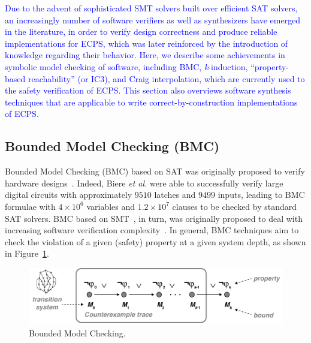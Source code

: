 \documentclass{cta-author}
\begin{document}
\textcolor{blue}{Due to the advent of sophisticated SMT solvers built over efficient SAT solvers, an increasingly number of software verifiers as well as synthesizers have emerged in the literature, in order to verify design correctness and produce reliable implementations for ECPS, which was later reinforced by the introduction of knowledge regarding their behavior. Here, we describe some achievements in symbolic model checking of software, including BMC, \textit{k}-induction, ``property-based reachability'' (or IC3), and Craig interpolation, which are currently used to the safety verification of ECPS. This section also overviews software synthesis techniques that are applicable to write correct-by-construction implementations of ECPS.}

\subsection{Bounded Model Checking (BMC)}
\label{BMC}

Bounded Model Checking (BMC) based on SAT was originally proposed to verify hardware designs~\cite{Biere99,handbook09}. Indeed, Biere {\it et al.} were able to successfully verify large digital circuits with approximately $9510$ latches and $9499$ inputs, leading to BMC formulae with $4 \times 10^6$ variables and $1.2 \times 10^7$ clauses to be checked by standard SAT solvers. BMC based on SMT~\cite{BarrettSST09}, in turn, was originally proposed to deal with increasing software verification complexity~\cite{Armando2009}. 
%
In general, BMC techniques aim to check the violation of a given (safety) property at a given system depth, as shown in Figure~\ref{bounded-model-checking}. 
%
\begin{figure}[h]
	\centering
	\includegraphics[width=\columnwidth]{figure2.jpg}
	\caption{Bounded Model Checking.}
	\label{bounded-model-checking}
\end{figure}
\end{document}
